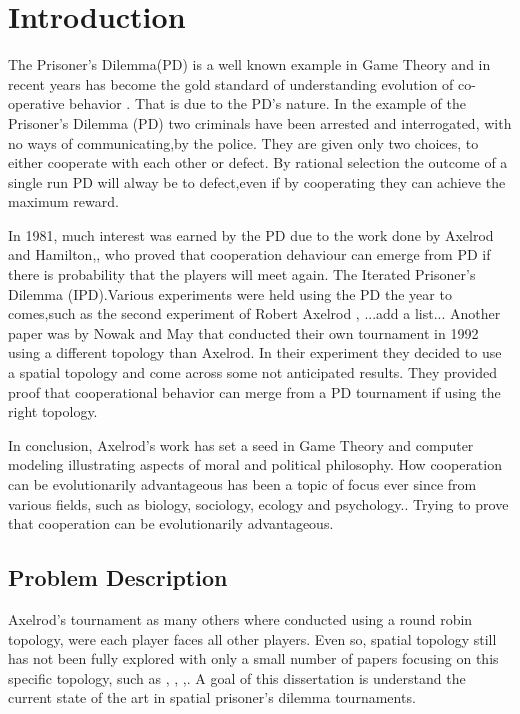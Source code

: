 \chapter{Introduction}

The Prisoner's Dilemma(PD) is a well known example in Game Theory and in recent
years has become the gold standard of understanding evolution of
co-operative behavior \parencite{Lorberbaum1994}. That is due to the PD's nature.
In the example of the Prisoner's Dilemma (PD) two criminals have been arrested and
interrogated, with no ways of communicating,by the police.
They are given only two choices, to either cooperate with each other or defect.
By rational selection the outcome of a single run PD will alway be to defect,even
if by cooperating they can achieve the maximum reward.

In 1981, much interest was earned by the PD due to the work done by Axelrod and
Hamilton,\parencite{Axelrod_&_Hamilton1981}, who proved that cooperation dehaviour
can emerge from PD if there is probability that the players will meet again. The
Iterated Prisoner's Dilemma (IPD).Various experiments were held using the PD the
year to comes,such as the second experiment of Robert Axelrod \parencite{Axelrod1980b},
...add a list...
Another paper was by Nowak and May \parencite{Nowak_&_May1992} that conducted
their own tournament in 1992 using a different topology than Axelrod. In their
experiment they decided to use a spatial topology and come across some not
anticipated results. They provided proof that cooperational behavior can merge
from a PD tournament if using the right topology.

In conclusion, Axelrod's work has set a seed in Game Theory and computer modeling
illustrating aspects of moral and political philosophy. How cooperation can be
evolutionarily advantageous has been a topic of focus ever since from various fields,
such as biology, sociology, ecology and psychology.\parencite{Nowak_&_May1992}.
Trying to prove that cooperation can be evolutionarily advantageous.

\section{Problem Description}
Axelrod's tournament as many others where conducted using a round robin topology,
were each player faces all other players. Even so, spatial topology still has
not been fully explored with only a small number of papers focusing on this
specific topology, such as \parencite{Nowak_&_May1993}, \parencite{Brauchli_&_Killingback_&_Doebelis1999},
\parencite{Meng&Xia_etc2015},\parencite{Lindgren_&_Nordahl1994}. A goal of this
dissertation is understand the current state of the art in spatial prisoner’s dilemma
tournaments.

